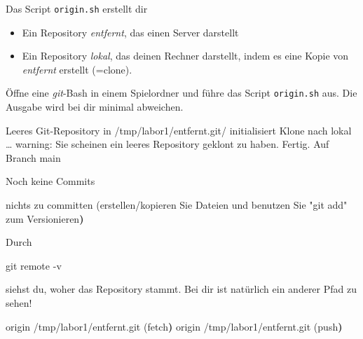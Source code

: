\documentclass[
  letterpaper,
  DIV=11]{scrreprt}
\newenvironment{Shaded}{\begin{snugshade}}{\end{snugshade}}
\newcommand{\AttributeTok}[1]{\textcolor[rgb]{0.40,0.45,0.13}{#1}}
\newcommand{\ErrorTok}[1]{\textcolor[rgb]{0.68,0.00,0.00}{#1}}
\newcommand{\ExtensionTok}[1]{\textcolor[rgb]{0.00,0.23,0.31}{#1}}
\newcommand{\FunctionTok}[1]{\textcolor[rgb]{0.28,0.35,0.67}{#1}}
\newcommand{\KeywordTok}[1]{\textcolor[rgb]{0.00,0.23,0.31}{\textbf{#1}}}
\newcommand{\NormalTok}[1]{\textcolor[rgb]{0.00,0.23,0.31}{#1}}
\newcommand{\StringTok}[1]{\textcolor[rgb]{0.13,0.47,0.30}{#1}}
\providecommand{\tightlist}{%
  \setlength{\itemsep}{0pt}\setlength{\parskip}{0pt}}\usepackage{longtable,booktabs,array}
\newcommand{\git}{\textit{git}\xspace}
\begin{document}
Das Script \texttt{origin.sh} erstellt dir

\begin{itemize}
\tightlist
\item
  Ein Repository \emph{entfernt}, das einen Server darstellt
\item
  Ein Repository \emph{lokal}, das deinen Rechner darstellt, indem es
  eine Kopie von \emph{entfernt} erstellt (=clone).
\end{itemize}

Öffne eine \git-Bash in einem Spielordner und führe das Script
\texttt{origin.sh} aus. Die Ausgabe wird bei dir minimal abweichen.

\begin{Shaded}
\begin{Highlighting}[]
\ExtensionTok{Leeres}\NormalTok{ Git{-}Repository in /tmp/labor1/entfernt.git/ initialisiert}
\ExtensionTok{Klone}\NormalTok{ nach }\StringTok{\textquotesingle{}lokal\textquotesingle{}}\NormalTok{ …}
\ExtensionTok{warning:}\NormalTok{ Sie scheinen ein leeres Repository geklont zu haben.}
\ExtensionTok{Fertig.}
\ExtensionTok{Auf}\NormalTok{ Branch main}

\ExtensionTok{Noch}\NormalTok{ keine Commits}

\ExtensionTok{nichts}\NormalTok{ zu committen }\ErrorTok{(}\ExtensionTok{erstellen/kopieren}\NormalTok{ Sie Dateien und benutzen}
\ExtensionTok{Sie} \StringTok{"git add"}\NormalTok{ zum Versionieren}\KeywordTok{)}
\end{Highlighting}
\end{Shaded}

Durch

\begin{Shaded}
\begin{Highlighting}[]
\FunctionTok{git}\NormalTok{ remote }\AttributeTok{{-}v} 
\end{Highlighting}
\end{Shaded}

siehst du, woher das Repository stammt. Bei dir ist natürlich ein
anderer Pfad zu sehen!

\begin{Shaded}
\begin{Highlighting}[]
\ExtensionTok{origin}\NormalTok{  /tmp/labor1/entfernt.git }\ErrorTok{(}\ExtensionTok{fetch}\KeywordTok{)}
\ExtensionTok{origin}\NormalTok{  /tmp/labor1/entfernt.git }\ErrorTok{(}\ExtensionTok{push}\KeywordTok{)}
\end{Highlighting}
\end{Shaded}
\end{document}
